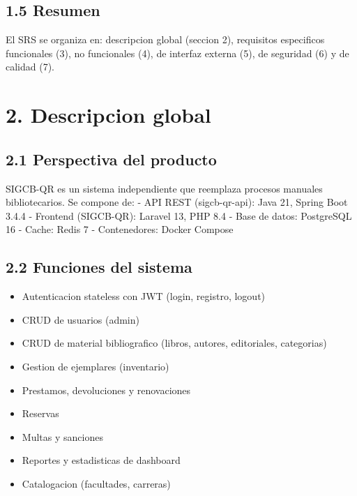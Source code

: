 \documentclass[
11pt,
a4paper,
]{report}
\providecommand{\tightlist}{%
	\setlength{\itemsep}{0pt}\setlength{\parskip}{0pt}}
\begin{document}
	\hypertarget{resumen}{%
		\subsection{1.5 Resumen}\label{resumen}}
	
	El SRS se organiza en: descripcion global (seccion 2), requisitos especificos funcionales (3), no funcionales (4), de interfaz externa (5), de seguridad (6) y de calidad (7).
	
	\hypertarget{descripcion-global}{%
		\section{2. Descripcion global}\label{descripcion-global}}
	
	\hypertarget{perspectiva-del-producto}{%
		\subsection{2.1 Perspectiva del producto}\label{perspectiva-del-producto}}
	
	SIGCB-QR es un sistema independiente que reemplaza procesos manuales bibliotecarios. Se compone de:
	- API REST (sigcb-qr-api): Java 21, Spring Boot 3.4.4
	- Frontend (SIGCB-QR): Laravel 13, PHP 8.4
	- Base de datos: PostgreSQL 16
	- Cache: Redis 7
	- Contenedores: Docker Compose
	
	\hypertarget{funciones-del-sistema}{%
		\subsection{2.2 Funciones del sistema}\label{funciones-del-sistema}}
	
	\begin{itemize}
		\tightlist
		\item
		Autenticacion stateless con JWT (login, registro, logout)
		\item
		CRUD de usuarios (admin)
		\item
		CRUD de material bibliografico (libros, autores, editoriales, categorias)
		\item
		Gestion de ejemplares (inventario)
		\item
		Prestamos, devoluciones y renovaciones
		\item
		Reservas
		\item
		Multas y sanciones
		\item
		Reportes y estadisticas de dashboard
		\item
		Catalogacion (facultades, carreras)
	\end{itemize}
	
\end{document}
